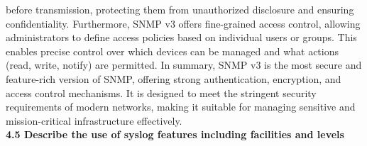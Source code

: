\documentclass{article}
\begin{document}
before transmission, protecting them from unauthorized disclosure and ensuring confidentiality. Furthermore, SNMP v3 offers fine-grained access control, allowing administrators to define access policies based on individual users or groups. This enables precise control over which devices can be managed and what actions (read, write, notify) are permitted. In summary, SNMP v3 is the most secure and feature-rich version of SNMP, offering strong authentication, encryption, and access control mechanisms. It is designed to meet the stringent security requirements of modern networks, making it suitable for managing sensitive and mission-critical infrastructure effectively.\\
  
\noindent\textbf{4.5 Describe the use of syslog features including facilities and levels}\\
\end{document}
